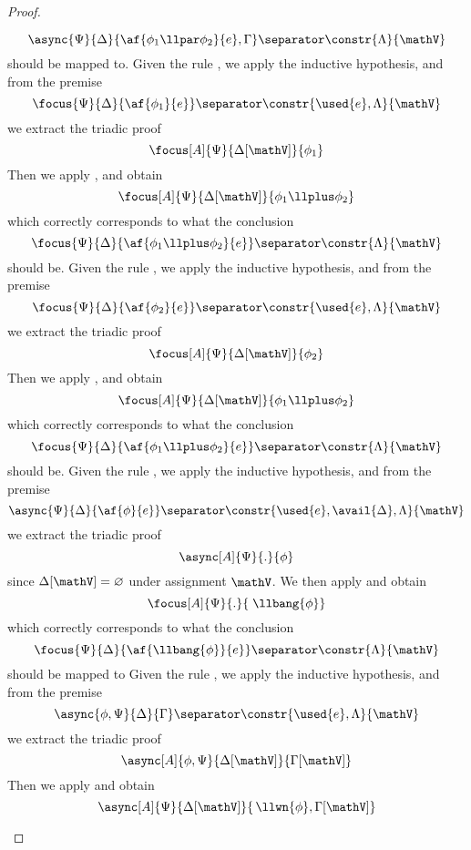 \begin{proof}
\begin{itemize}
			$$ \async{\Psi}{\Delta}{\af{\phi_1 \llpar \phi_2}{e}, \Gamma} \separator \constr{\Lambda}{\mathV} $$
			should be mapped to.
		\indCase{\displayplus[L]} Given the rule \derRule{\displayplus[L]}, we apply the inductive hypothesis, and from the premise
			$$ \focus{\Psi}{\Delta}{\af{\phi_1}{e}} \separator \constr{\used{e}, \Lambda}{\mathV}$$
			we extract the triadic proof
			$$ \focus[A]{\Psi}{\Delta[\mathV]}{\phi_1} $$
			Then we apply \derRule[A]{\displayplus[L]}, and obtain
			$$ \focus[A]{\Psi}{\Delta[\mathV]}{\phi_1 \llplus \phi_2} $$
			which correctly corresponds to what the conclusion
			$$ \focus{\Psi}{\Delta}{\af{\phi_1 \llplus \phi_2}{e}} \separator \constr{\Lambda}{\mathV} $$
			should be.
		\indCase{\displayplus[R]} Given the rule \derRule{\displayplus[R]}, we apply the inductive hypothesis, and from the premise
			$$ \focus{\Psi}{\Delta}{\af{\phi_2}{e}} \separator \constr{\used{e}, \Lambda}{\mathV}$$
			we extract the triadic proof
			$$ \focus[A]{\Psi}{\Delta[\mathV]}{\phi_2} $$
			Then we apply \derRule[A]{\displayplus[R]}, and obtain
			$$ \focus[A]{\Psi}{\Delta[\mathV]}{\phi_1 \llplus \phi_2} $$
			which correctly corresponds to what the conclusion
			$$ \focus{\Psi}{\Delta}{\af{\phi_1 \llplus \phi_2}{e}} \separator \constr{\Lambda}{\mathV} $$
			should be.
		\indCase{\displaybang} Given the rule \derRule{\displaybang}, we apply the inductive hypothesis, and from the premise
			$$ \async{\Psi}{\Delta}{\af{\phi}{e}} \separator \constr{\used{e}, \avail{\Delta}, \Lambda}{\mathV} $$
			we extract the triadic proof
			$$ \async[A]{\Psi}{.}{\phi} $$
			since $\Delta[\mathV] = \varnothing$ under assignment $\mathV$.
			We then apply \derRule[A]{\displaybang} and obtain
			$$ \focus[A]{\Psi}{.}{\;\llbang{\phi}} $$
			which correctly corresponds to what the conclusion 
			$$ \focus{\Psi}{\Delta}{\af{\llbang{\phi}}{e}} \separator \constr{\Lambda}{\mathV} $$
			should be mapped to
		\indCase{\displaywn} Given the rule \derRule{\displaywn}, we apply the inductive hypothesis, and from the premise
			$$ \async{\phi, \Psi}{\Delta}{\Gamma} \separator \constr{\used{e}, \Lambda}{\mathV} $$
			we extract the triadic proof
			$$ \async[A]{\phi, \Psi}{\Delta[\mathV]}{\Gamma[\mathV]}$$
			Then we apply \derRule[A]{\displaywn} and obtain
			$$ \async[A]{\Psi}{\Delta[\mathV]}{\,\llwn{\phi}, \Gamma[\mathV]} $$

\end{itemize}
\end{proof}
